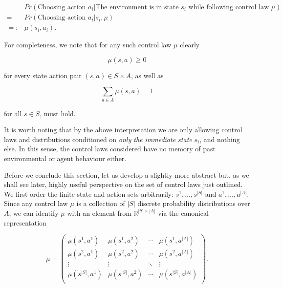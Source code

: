 \documentclass[11pt]{article} %
\begin{document}
\begin{equation}\label{controlProb}
	\begin{array}{ll}
			& 	Pr(\text{Choosing action }a_i | \text{The environment is in state } s_i \text{ while following control law }\mu) \\
		=	&	Pr(\text{Choosing action }a_i | s_i, \mu) \\
		=:	&	\mu(s_i, a_i).
	\end{array}
\end{equation}

For completeness, we note that for any such control law $\mu$ clearly 

\begin{equation}\label{controlProbPositive}
	\mu(s,a) \ge 0
\end{equation}

 for every state action pair $(s,a) \in S \times A$, as well as 

\begin{equation}\label{controlProbSum1}
	\sum\limits_{a \in A} \mu(s,a) = 1
\end{equation}

for all $s \in S$, must hold. 

It is worth noting that by the above interpretation we are only allowing control laws and distributions conditioned on \textit{only the immediate state} $s_i$, and nothing else. In this sense, the control laws considered have no memory of past environmental or agent behaviour either.

Before we conclude this section, let us develop a slightly more abstract but, as we shall see later, highly useful perspective on the set of control laws just outlined. We first order the finite state and action sets arbitrarily: $s^1,\dots,s^{|S|}$ and $a^1,\dots,a^{|A|}$. Since any control law $\mu$ is a collection of $|S|$ discrete probability distributions over $A$, we can identify $\mu$ with an element from $\mathbb{R}^{|S| \times |A|}$ via the canonical representation

\begin{equation}\label{controlProbMatrix}
	\mu = \left(	\begin{array}{cccc}
					\mu(s^1,a^1)	&	\mu(s^1,a^2)	&	\cdots 	&	\mu(s^1,a^{|A|}) \\
					\mu(s^2,a^1)	&	\mu(s^2,a^2)	&	\cdots 	&	\mu(s^2,a^{|A|}) \\
					\vdots 		&	\vdots 		& 	\ddots 	& 	\vdots \\
					\mu(s^{|S|},a^1)	&	\mu(s^{|S|},a^2)	&	\cdots 	&	\mu(s^{|S|},a^{|A|}) \\
				\end{array}
		\right).
\end{equation}
\end{document}
